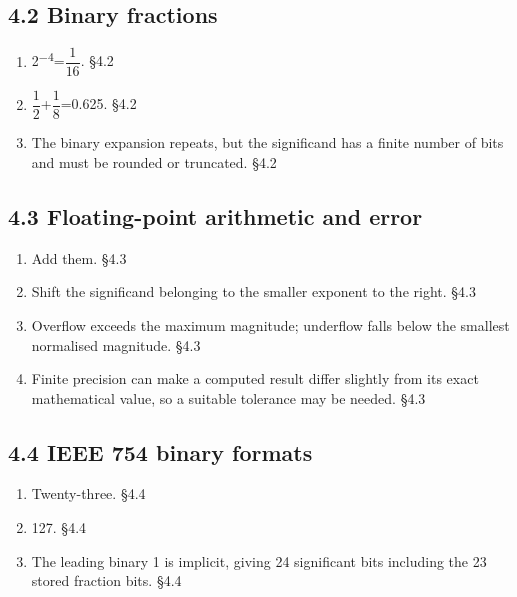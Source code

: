 \documentclass[11pt]{article}
\begin{document}
\begin{keepsection}\subsection{4.2 Binary fractions}

\begin{enumerate}
\item 2\textsuperscript{\ensuremath{-}4}={\small\ensuremath{\dfrac{1}{16}}}. \hfill{\small\color{FAUblue}§4.2}
\item {\small\ensuremath{\dfrac{1}{2}}}+{\small\ensuremath{\dfrac{1}{8}}}=0.625. \hfill{\small\color{FAUblue}§4.2}
\item The binary expansion repeats, but the significand has a finite number of bits and must be rounded or truncated. \hfill{\small\color{FAUblue}§4.2}
\end{enumerate}

\end{keepsection}
\begin{keepsection}\subsection{4.3 Floating-point arithmetic and error}

\begin{enumerate}
\item Add them. \hfill{\small\color{FAUblue}§4.3}
\item Shift the significand belonging to the smaller exponent to the right. \hfill{\small\color{FAUblue}§4.3}
\item Overflow exceeds the maximum magnitude; underflow falls below the smallest normalised magnitude. \hfill{\small\color{FAUblue}§4.3}
\item Finite precision can make a computed result differ slightly from its exact mathematical value, so a suitable tolerance may be needed. \hfill{\small\color{FAUblue}§4.3}
\end{enumerate}

\end{keepsection}
\begin{keepsection}\subsection{4.4 IEEE 754 binary formats}

\begin{enumerate}
\item Twenty-three. \hfill{\small\color{FAUblue}§4.4}
\item 127. \hfill{\small\color{FAUblue}§4.4}
\item The leading binary 1 is implicit, giving 24 significant bits including the 23 stored fraction bits. \hfill{\small\color{FAUblue}§4.4}
\end{enumerate}

\end{keepsection}
\end{document}
